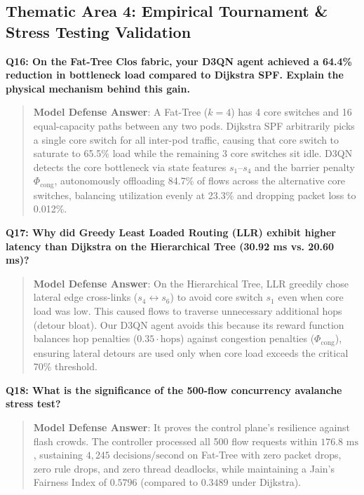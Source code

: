 \documentclass[12pt,a4paper,oneside]{report}
\begin{document}
\subsection{Thematic Area 4: Empirical Tournament & Stress Testing Validation}

\noindent\textbf{Q16: On the Fat-Tree Clos fabric, your D3QN agent achieved a 64.4\% reduction in bottleneck load compared to Dijkstra SPF. Explain the physical mechanism behind this gain.}
\begin{quote}
\small
\textbf{Model Defense Answer}: A Fat-Tree ($k=4$) has 4 core switches and 16 equal-capacity paths between any two pods. Dijkstra SPF arbitrarily picks a single core switch for all inter-pod traffic, causing that core switch to saturate to 65.5\% load while the remaining 3 core switches sit idle. D3QN detects the core bottleneck via state features $s_1$--$s_4$ and the barrier penalty $\Phi_{\text{cong}}$, autonomously offloading 84.7\% of flows across the alternative core switches, balancing utilization evenly at 23.3\% and dropping packet loss to 0.012\%.
\end{quote}

\noindent\textbf{Q17: Why did Greedy Least Loaded Routing (LLR) exhibit higher latency than Dijkstra on the Hierarchical Tree (30.92 ms vs. 20.60 ms)?}
\begin{quote}
\small
\textbf{Model Defense Answer}: On the Hierarchical Tree, LLR greedily chose lateral edge cross-links ($s_4 \leftrightarrow s_6$) to avoid core switch $s_1$ even when core load was low. This caused flows to traverse unnecessary additional hops (detour bloat). Our D3QN agent avoids this because its reward function balances hop penalties ($0.35 \cdot \text{hops}$) against congestion penalties ($\Phi_{\text{cong}}$), ensuring lateral detours are used only when core load exceeds the critical 70\% threshold.
\end{quote}

\noindent\textbf{Q18: What is the significance of the 500-flow concurrency avalanche stress test?}
\begin{quote}
\small
\textbf{Model Defense Answer}: It proves the control plane's resilience against flash crowds. The controller processed all 500 flow requests within $176.8\text{ ms}$, sustaining $4,245\text{ decisions/second}$ on Fat-Tree with zero packet drops, zero rule drops, and zero thread deadlocks, while maintaining a Jain's Fairness Index of $0.5796$ (compared to $0.3489$ under Dijkstra).
\end{quote}
\end{document}
